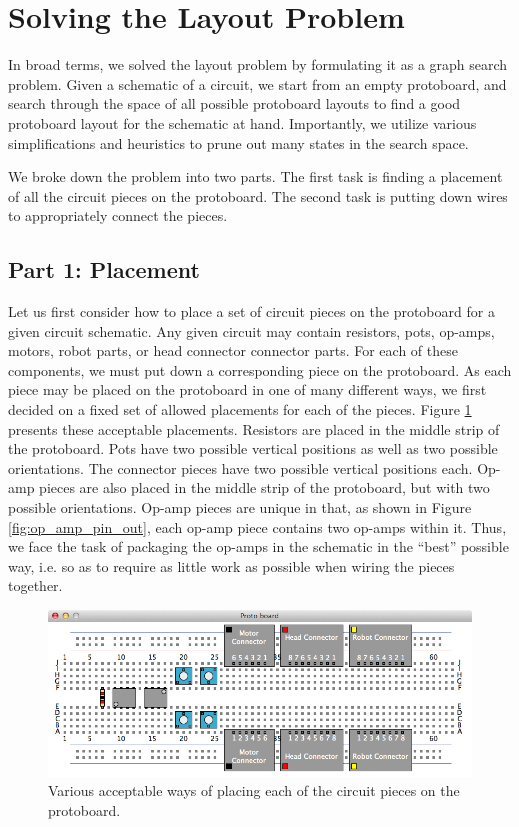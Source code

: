 \section{Solving the Layout Problem}

In broad terms, we solved the layout problem by formulating it as a graph search
problem. Given a schematic of a circuit, we start from an empty
protoboard, and search through the space of all possible protoboard layouts to
find a good protoboard layout for the schematic at hand. Importantly, we
utilize various simplifications and heuristics to prune out many states in the
search space.

We broke down the problem into two parts. The first task is finding a placement
of all the circuit pieces on the protoboard. The second task is putting down
wires to appropriately connect the pieces.

\subsection{Part 1: Placement}
\label{sec:placement}

Let us first consider how to place a set of circuit pieces on the protoboard for
a given circuit schematic. Any given circuit may contain resistors, pots,
op-amps, motors, robot parts, or head connector connector parts.
For each of these
components, we must put down a corresponding piece on the protoboard. As each
piece may be placed on the protoboard in one of many different ways, we first
decided on a fixed set of allowed placements for each of the pieces. Figure
\ref{fig:piece_placement} presents these acceptable placements.
Resistors are placed in the middle strip of the protoboard.
Pots have two possible vertical positions as well as two possible orientations.
The connector pieces have two possible vertical positions each.
Op-amp pieces are also placed in the middle strip of the protoboard, but with
two possible orientations. Op-amp pieces are unique in that, as shown in Figure
\ref{fig:op_amp_pin_out}, each op-amp piece
contains two op-amps within it. Thus, we face the task of packaging the op-amps
in the schematic in the ``best'' possible way, i.e. so as to require as little
work as possible when wiring the pieces together.

\begin{figure}
\begin{center}
\includegraphics[width=\linewidth]{Images/piece_placement_options.png}
\caption[Acceptable circuit piece placements]{Various acceptable ways of
placing each of the circuit pieces on the protoboard.}
\label{fig:piece_placement}
\end{center}
\end{figure}

